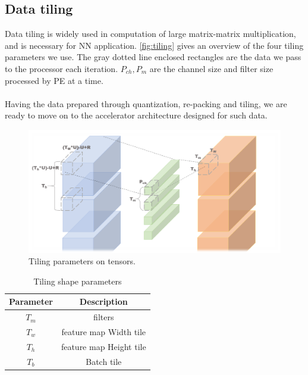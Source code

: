 \subsection{Data tiling}
Data tiling is widely used in computation of large matrix-matrix multiplication, and is necessary for NN application. \autoref{fig:tiling} gives an overview of the four tiling parameters we use. The gray dotted line enclosed rectangles are the data we pass to the processor each iteration. $P_{ch},P_m$ are the channel size and filter size processed by PE at a time. \\
\\
Having the data prepared through quantization, re-packing and tiling, we are ready to move on to the accelerator architecture designed for such data.
\begin{figure}[h]
    \centering
    \includegraphics[width=1\linewidth]{inc/3_low_numeric_convolution_neural_network/figure/tiling.png}
    \caption{Tiling parameters on tensors.}
    \label{fig:tiling}
\end{figure}

\begin{table}[h]
    \caption{Tiling shape parameters}
    \label{tab:tile_shape}
    \centering
    \footnotesize 
        \begin{tabular}{cc}
        \toprule
        Parameter & Description \\
        \midrule
            $T_m$ & filters\\
            $T_w$ & feature map Width tile\\
            $T_h$ & feature map Height tile\\
            $T_b$ & Batch tile\\
        \bottomrule
        \end{tabular}
\end{table}


